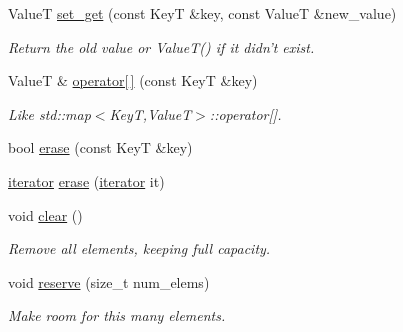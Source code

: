 \begin{DoxyCompactItemize}
\item 
\hypertarget{classemlib_1_1_hash_map_a377a2628b72d1df98bd7ba1e0e6fb073}{Value\+T \hyperlink{classemlib_1_1_hash_map_a377a2628b72d1df98bd7ba1e0e6fb073}{set\+\_\+get} (const Key\+T \&key, const Value\+T \&new\+\_\+value)}\label{classemlib_1_1_hash_map_a377a2628b72d1df98bd7ba1e0e6fb073}

\begin{DoxyCompactList}\small\item\em Return the old value or Value\+T() if it didn't exist. \end{DoxyCompactList}\item 
\hypertarget{classemlib_1_1_hash_map_a9ac5677d0618b3ecb74badc487d848d3}{Value\+T \& \hyperlink{classemlib_1_1_hash_map_a9ac5677d0618b3ecb74badc487d848d3}{operator\mbox{[}$\,$\mbox{]}} (const Key\+T \&key)}\label{classemlib_1_1_hash_map_a9ac5677d0618b3ecb74badc487d848d3}

\begin{DoxyCompactList}\small\item\em Like std\+::map$<$\+Key\+T,\+Value\+T$>$\+::operator\mbox{[}\mbox{]}. \end{DoxyCompactList}\item 
bool \hyperlink{classemlib_1_1_hash_map_addffd4127ebfe38c674d77ee5f8e4794}{erase} (const Key\+T \&key)
\item 
\hyperlink{classemlib_1_1_hash_map_1_1iterator}{iterator} \hyperlink{classemlib_1_1_hash_map_a01155a148f06ba139dfd4eca08eb27d8}{erase} (\hyperlink{classemlib_1_1_hash_map_1_1iterator}{iterator} it)
\item 
\hypertarget{classemlib_1_1_hash_map_a3e0fd4bc2e08ee52bced57b9d9d0ae93}{void \hyperlink{classemlib_1_1_hash_map_a3e0fd4bc2e08ee52bced57b9d9d0ae93}{clear} ()}\label{classemlib_1_1_hash_map_a3e0fd4bc2e08ee52bced57b9d9d0ae93}

\begin{DoxyCompactList}\small\item\em Remove all elements, keeping full capacity. \end{DoxyCompactList}\item 
\hypertarget{classemlib_1_1_hash_map_a4f598f48f408fa352079902f4aa31b01}{void \hyperlink{classemlib_1_1_hash_map_a4f598f48f408fa352079902f4aa31b01}{reserve} (size\+\_\+t num\+\_\+elems)}\label{classemlib_1_1_hash_map_a4f598f48f408fa352079902f4aa31b01}

\begin{DoxyCompactList}\small\item\em Make room for this many elements. \end{DoxyCompactList}\end{DoxyCompactItemize}


